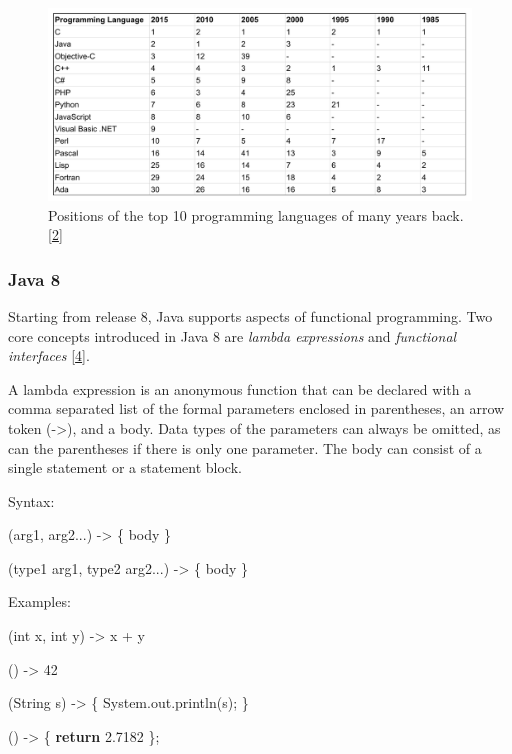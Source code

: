 \documentclass[12pt,a4paper,oneside,openright]{book}
\newenvironment{Shaded}{\begin{snugshade}}{\end{snugshade}}
\newcommand{\KeywordTok}[1]{\textcolor[rgb]{0.13,0.29,0.53}{\textbf{{#1}}}}
\newcommand{\DataTypeTok}[1]{\textcolor[rgb]{0.13,0.29,0.53}{{#1}}}
\newcommand{\DecValTok}[1]{\textcolor[rgb]{0.00,0.00,0.81}{{#1}}}
\newcommand{\FloatTok}[1]{\textcolor[rgb]{0.00,0.00,0.81}{{#1}}}
\newcommand{\FunctionTok}[1]{\textcolor[rgb]{0.00,0.00,0.00}{{#1}}}
\newcommand{\NormalTok}[1]{{#1}}
\begin{document}
\begin{figure}[htbp]
\centering
\includegraphics{figures/history_rank.pdf}
\caption{Positions of the top 10 programming languages of many years
back. {[}\hyperref[ref-TIOBEIndex2015]{2}{]} \label{history-rank}}
\end{figure}

\subsubsection{Java 8}\label{java-8}

Starting from release 8, Java supports aspects of functional
programming. Two core concepts introduced in Java 8 are \emph{lambda
expressions} and \emph{functional interfaces}
{[}\hyperref[ref-OracleLambda2015]{4}{]}.

A lambda expression is an anonymous function that can be declared with a
comma separated list of the formal parameters enclosed in parentheses,
an arrow token (-\textgreater{}), and a body. Data types of the
parameters can always be omitted, as can the parentheses if there is
only one parameter. The body can consist of a single statement or a
statement block.

Syntax:

\begin{Shaded}
\begin{Highlighting}[]
    \NormalTok{(arg1, arg2...) -> \{ body \}}

    \NormalTok{(type1 arg1, type2 arg2...) -> \{ body \}}
\end{Highlighting}
\end{Shaded}

Examples:

\begin{Shaded}
\begin{Highlighting}[]
    \NormalTok{(}\DataTypeTok{int} \NormalTok{x, }\DataTypeTok{int} \NormalTok{y) -> x + y}

    \NormalTok{() -> }\DecValTok{42}

    \NormalTok{(String s) -> \{ System.}\FunctionTok{out}\NormalTok{.}\FunctionTok{println}\NormalTok{(s); \}}

    \NormalTok{() -> \{ }\KeywordTok{return} \FloatTok{2.7182} \NormalTok{\};}
\end{Highlighting}
\end{Shaded}
\end{document}
